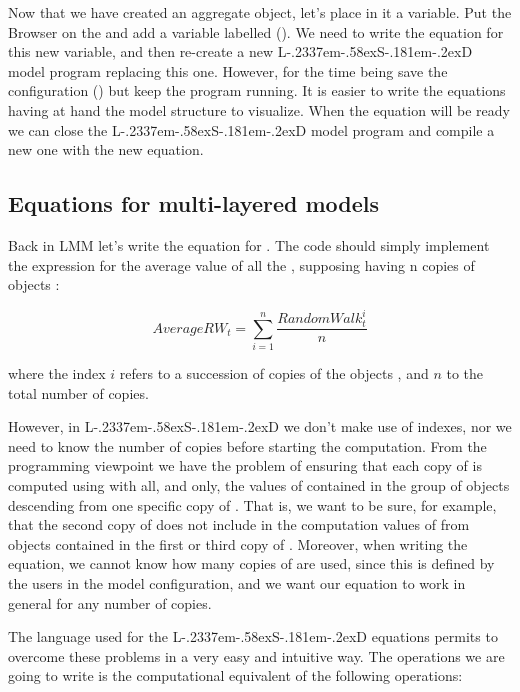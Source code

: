 \documentclass [11pt,a4paper] {book}
\def\LsD{{L\kern-.2337em\lower-.58ex\hbox{S}\kern-.181em\lower-.2ex\hbox{D}}\xspace}
\begin{document}
Now that we have created an aggregate object, let's place in it a variable. Put the
Browser on the  and add a variable labelled 
(). We need to write the equation for this new variable, and then re-create a new \LsD model program replacing this one. However, for the time being save the configuration () but keep the program running. It is easier to write the equations having at hand the model structure to visualize. When the equation will be ready we can close the \LsD model program and compile a new one with the new equation.




\subsection{Equations for multi-layered models}

Back in LMM let's write the equation for . The code should simply
implement the expression for the average value of all the , supposing
having n copies of objects :

$$ AverageRW_t = \sum_{i=1}^n \frac{RandomWalk^i_t}{n} $$

where the index $i$ refers to a succession of copies of the objects , and $n$ to the total number of copies.

However, in \LsD we don't make use of indexes, nor we need to know the number of copies before starting the computation.  From the programming viewpoint we have the problem of ensuring that each copy of  is computed using with all, and only, the values of 
contained in the group of objects  descending from one specific copy of . That is, we want to be sure, for example, that the second copy of  does not include in the computation values of  from objects contained in the first or third copy of . Moreover, when writing the equation, we cannot know how many copies of  are used, since
this is defined by the users in the model configuration, and we want our equation to work in general for any number of copies.

The language used for the \LsD equations permits to overcome these problems in a very easy
and intuitive way. The operations we are going to write is the computational equivalent of the following operations:
\end{document}
